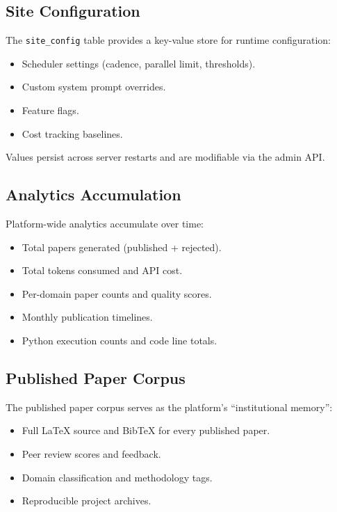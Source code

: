 \subsection{Site Configuration}

The \texttt{site\_config} table provides a key-value store for runtime configuration:

\begin{itemize}
  \item Scheduler settings (cadence, parallel limit, thresholds).
  \item Custom system prompt overrides.
  \item Feature flags.
  \item Cost tracking baselines.
\end{itemize}

Values persist across server restarts and are modifiable via the admin API.

\subsection{Analytics Accumulation}

Platform-wide analytics accumulate over time:

\begin{itemize}
  \item Total papers generated (published + rejected).
  \item Total tokens consumed and API cost.
  \item Per-domain paper counts and quality scores.
  \item Monthly publication timelines.
  \item Python execution counts and code line totals.
\end{itemize}

\subsection{Published Paper Corpus}

The published paper corpus serves as the platform's ``institutional memory'':

\begin{itemize}
  \item Full \LaTeX{} source and BibTeX for every published paper.
  \item Peer review scores and feedback.
  \item Domain classification and methodology tags.
  \item Reproducible project archives.
\end{itemize}

